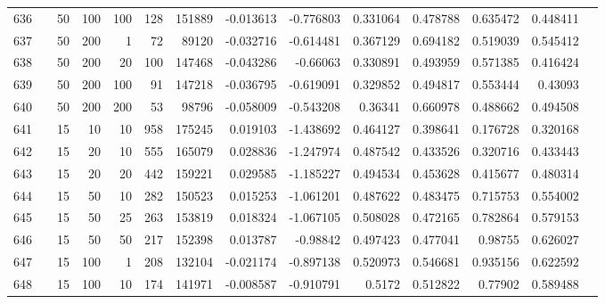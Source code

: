 \begin{longtable}{llrrrrrrrrrrrr}
		636 & &           50 &               100 &          100 &         128 &     151889 & -0.013613 & -0.776803 &  0.331064 &    0.478788 &       0.635472 &  0.448411 \\
		637 & &           50 &               200 &            1 &          72 &      89120 & -0.032716 & -0.614481 &  0.367129 &    0.694182 &       0.519039 &  0.545412 \\
		638 & &           50 &               200 &           20 &         100 &     147468 & -0.043286 &  -0.66063 &  0.330891 &    0.493959 &       0.571385 &  0.416424 \\
		639 & &           50 &               200 &          100 &          91 &     147218 & -0.036795 & -0.619091 &  0.329852 &    0.494817 &       0.553444 &   0.43093 \\
		640 & &           50 &               200 &          200 &          53 &      98796 & -0.058009 & -0.543208 &   0.36341 &    0.660978 &       0.488662 &  0.494508 \\\midrule
		641 & \multirow[t]{46}{*}{\rotatebox[origin=r]{90}{use-mean}} &           15 &                10 &           10 &         958 &     175245 &  0.019103 & -1.438692 &  0.464127 &    0.398641 &       0.176728 &  0.320168 \\
		642 & &           15 &                20 &           10 &         555 &     165079 &  0.028836 & -1.247974 &  0.487542 &    0.433526 &       0.320716 &  0.433443 \\
		643 & &           15 &                20 &           20 &         442 &     159221 &  0.029585 & -1.185227 &  0.494534 &    0.453628 &       0.415677 &  0.480314 \\
		644 & &           15 &                50 &           10 &         282 &     150523 &  0.015253 & -1.061201 &  0.487622 &    0.483475 &       0.715753 &  0.554002 \\
		645 & &           15 &                50 &           25 &         263 &     153819 &  0.018324 & -1.067105 &  0.508028 &    0.472165 &       0.782864 &  0.579153 \\
		646 & &           15 &                50 &           50 &         217 &     152398 &  0.013787 &  -0.98842 &  0.497423 &    0.477041 &        0.98755 &  0.626027 \\
		647 & &           15 &               100 &            1 &         208 &     132104 & -0.021174 & -0.897138 &  0.520973 &    0.546681 &       0.935156 &  0.622592 \\
		648 & &           15 &               100 &           10 &         174 &     141971 & -0.008587 & -0.910791 &    0.5172 &    0.512822 &        0.77902 &  0.589488 \\

\end{longtable}
